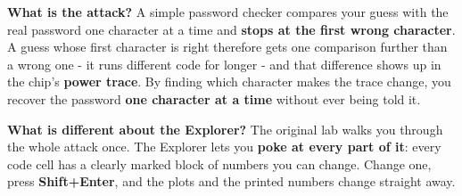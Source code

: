 \documentclass[11pt,letterpaper]{article}
\begin{document}
\vspace{4pt}


\guidelegend

\vspace{4pt}


\clearpage

\tableofcontents

\clearpage


\textbf{What is the attack?} A simple password checker compares your guess with the real password one character at a
time and \textbf{stops at the first wrong character}. A guess whose first character is right therefore gets one
comparison further than a wrong one - it runs different code for longer - and that difference shows up in the chip's
\textbf{power trace}. By finding which character makes the trace change, you recover the password \textbf{one
character at a time} without ever being told it.

\textbf{What is different about the Explorer?} The original lab walks you through the whole attack once. The Explorer
lets you \textbf{poke at every part of it}: every code cell has a clearly marked block of numbers you can change.
Change one, press \textbf{Shift+Enter}, and the plots and the printed numbers change straight away.

\end{document}

